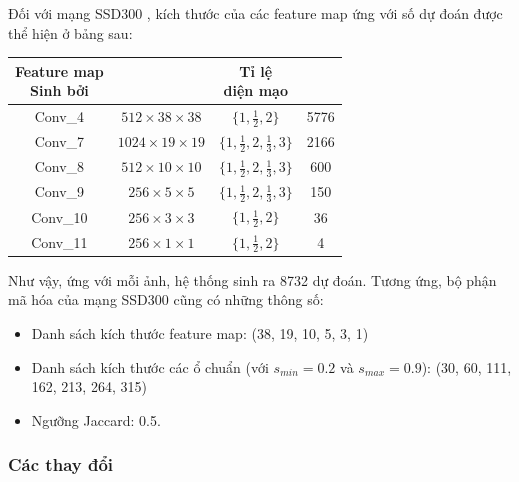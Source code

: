 \documentclass[a4paper,12pt]{article}
\begin{document}
	Đối với mạng SSD300\cite{liu2016ssd} , kích thước của các feature map ứng với số dự đoán được thể hiện ở bảng sau:
	
	\begin{center}
		\begin{tabular}{||c | c | c | c ||} 
			\hline
			\makecell{ Feature map \\ Sinh bởi } & \makecell{ Kích thước} & \makecell{Tỉ lệ \\ diện mạo } &  \makecell{ Số dự đoán } \\ [0.5ex] 
			\hline\hline
			Conv\_4 & $512 \times 38 \times 38$ & $ \{ 1, \frac{1}{2} , 2\} $ & 5776 \\ 
			\hline
			Conv\_7 & $1024 \times 19 \times 19$ & $ \{ 1, \frac{1}{2} , 2, \frac{1}{3}, 3\} $ & 2166 \\ 
			\hline
			Conv\_8 & $512 \times 10 \times 10$ &  $ \{ 1, \frac{1}{2} , 2, \frac{1}{3}, 3\} $ & 600 \\ 
			\hline
			Conv\_9 & $256 \times 5 \times 5 $ &  $ \{ 1, \frac{1}{2} , 2, \frac{1}{3}, 3\} $ & 150  \\ 
			\hline
			Conv\_10 & $256 \times 3 \times 3$ & $ \{ 1, \frac{1}{2} , 2\} $ & 36 \\ 
			\hline
			Conv\_11 & $256 \times 1 \times 1$ & $ \{ 1, \frac{1}{2} , 2\} $ & 4 \\ 
			\hline
		\end{tabular}
	\end{center}
	
	Như vậy, ứng với mỗi ảnh, hệ thống sinh ra 8732 dự đoán. Tương ứng, bộ phận mã hóa của mạng SSD300\cite{liu2016ssd} cũng có những thông số:
	
	\begin{itemize}
		\item Danh sách kích thước feature map: (38, 19, 10, 5, 3, 1)
		\item Danh sách kích thước các ổ chuẩn (với $s_{min} = 0.2$ và $s_{max} = 0.9$): (30, 60, 111, 162, 213, 264, 315)
		\item Ngưỡng Jaccard\cite{Jaccard}: 0.5.
	\end{itemize}
	
	\subsubsection{Các thay đổi}
	
\end{document}
